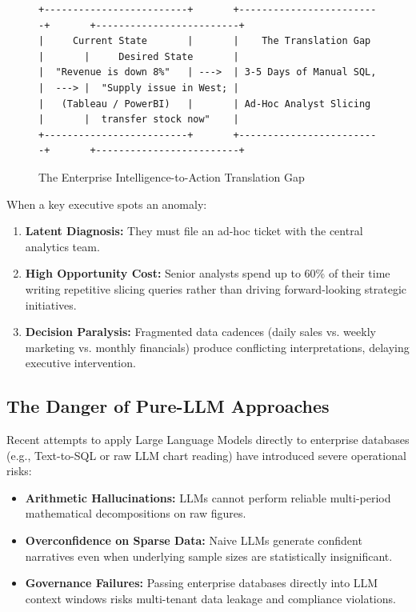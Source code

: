 \documentclass[11pt,a4paper]{article}
\begin{document}
\begin{figure}[h!]
\centering
\footnotesize
\begin{verbatim}
+-------------------------+       +-------------------------+       +-------------------------+
|     Current State       |       |    The Translation Gap  |       |     Desired State       |
|  "Revenue is down 8%"   | --->  | 3-5 Days of Manual SQL, |  ---> |  "Supply issue in West; |
|   (Tableau / PowerBI)   |       | Ad-Hoc Analyst Slicing  |       |  transfer stock now"    |
+-------------------------+       +-------------------------+       +-------------------------+
\end{verbatim}
\caption{The Enterprise Intelligence-to-Action Translation Gap}
\end{figure}

When a key executive spots an anomaly:
\begin{enumerate}[leftmargin=*]
    \item \textbf{Latent Diagnosis:} They must file an ad-hoc ticket with the central analytics team.
    \item \textbf{High Opportunity Cost:} Senior analysts spend up to 60\% of their time writing repetitive slicing queries rather than driving forward-looking strategic initiatives.
    \item \textbf{Decision Paralysis:} Fragmented data cadences (daily sales vs. weekly marketing vs. monthly financials) produce conflicting interpretations, delaying executive intervention.
\end{enumerate}

\subsection{The Danger of Pure-LLM Approaches}
Recent attempts to apply Large Language Models directly to enterprise databases (e.g., Text-to-SQL or raw LLM chart reading) have introduced severe operational risks:
\begin{itemize}[noitemsep]
    \item \textbf{Arithmetic Hallucinations:} LLMs cannot perform reliable multi-period mathematical decompositions on raw figures.
    \item \textbf{Overconfidence on Sparse Data:} Naive LLMs generate confident narratives even when underlying sample sizes are statistically insignificant.
    \item \textbf{Governance Failures:} Passing enterprise databases directly into LLM context windows risks multi-tenant data leakage and compliance violations.
\end{itemize}
\end{document}
